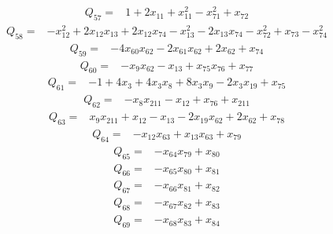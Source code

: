 {%
\begin{align*}
 Q_{57}={}&1 +2x_{11} +x_{11}^{2} -x_{71}^{2} +x_{72}
\end{align*}
\begin{align*}
 Q_{58}={}&-x_{12}^{2} +2x_{12}x_{13} +2x_{12}x_{74} -x_{13}^{2} -2x_{13}x_{74} -x_{72}^{2} +x_{73} -x_{74}^{2}
\end{align*}
\begin{align*}
 Q_{59}={}&-4x_{60}x_{62} -2x_{61}x_{62} +2x_{62} +x_{74}
\end{align*}
\begin{align*}
 Q_{60}={}&-x_{9}x_{62} -x_{13} +x_{75}x_{76} +x_{77}
\end{align*}
\begin{align*}
 Q_{61}={}&-1 +4x_{3} +4x_{3}x_{8} +8x_{3}x_{9} -2x_{3}x_{19} +x_{75}
\end{align*}
\begin{align*}
 Q_{62}={}&-x_{8}x_{211} -x_{12} +x_{76} +x_{211}
\end{align*}
\begin{align*}
 Q_{63}={}&x_{9}x_{211} +x_{12} -x_{13} -2x_{19}x_{62} +2x_{62} +x_{78}
\end{align*}
\begin{align*}
 Q_{64}={}&-x_{12}x_{63} +x_{13}x_{63} +x_{79}
\end{align*}
\begin{align*}
 Q_{65}={}&-x_{64}x_{79} +x_{80}
\end{align*}
\begin{align*}
 Q_{66}={}&-x_{65}x_{80} +x_{81}
\end{align*}
\begin{align*}
 Q_{67}={}&-x_{66}x_{81} +x_{82}
\end{align*}
\begin{align*}
 Q_{68}={}&-x_{67}x_{82} +x_{83}
\end{align*}
\begin{align*}
 Q_{69}={}&-x_{68}x_{83} +x_{84}
\end{align*}
}
